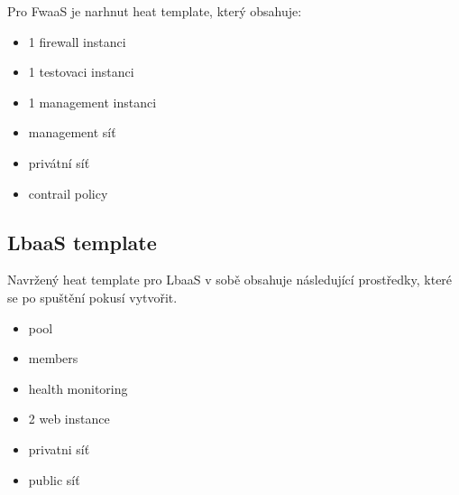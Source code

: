 Pro FwaaS je narhnut heat template, který obsahuje:

\begin{itemize}
\item 1 firewall instanci
\item 1 testovaci instanci
\item 1 management instanci
\item management síť
\item privátní síť
\item contrail policy
\end{itemize}



\subsection{LbaaS template}


Navržený heat template pro LbaaS v sobě obsahuje následující prostředky, které se po spuštění pokusí vytvořit.

\begin{itemize}
\item pool
\item members
\item health monitoring
\item 2 web instance
\item privatni síť
\item public síť
\end{itemize}
